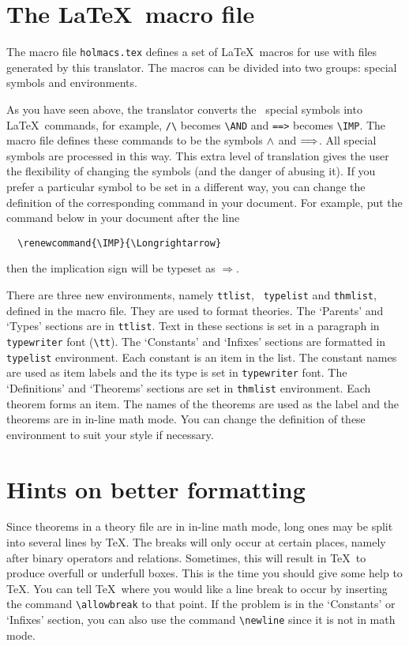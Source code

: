 \section{The \LaTeX\ macro file}

The macro file {\tt holmacs.tex} defines a set of \LaTeX\ macros for
use with files generated by this translator. The macros can be divided
into two groups: special symbols and environments.

As you have seen above, the translator converts the \HOL\ special
symbols into \LaTeX\ commands, for example, \verb|/\| becomes
\verb|\AND| and \verb|==>| becomes \verb|\IMP|. The macro file defines
these commands to be the symbols $\AND$ and $\IMP$. All special
symbols are processed in this way. This extra level of translation
gives the user the flexibility of changing the symbols (and the danger
of abusing it). If you prefer a
particular symbol to be set in a different way, you can change the
definition of the corresponding command in your document. For example,
put the command below in your document after the \verb||
line
\begin{verbatim}
  \renewcommand{\IMP}{\Longrightarrow}
\end{verbatim}
then the implication sign will be typeset as $\Longrightarrow$.

There are three new environments, namely {\tt ttlist}, {\tt
typelist} and {\tt thmlist}, defined in the macro file. They are used
to format theories. The 
`Parents' and `Types' sections are in {\tt ttlist}. Text in these
sections is set in a paragraph in {\tt typewriter} font (\verb|\tt|).
The `Constants' and `Infixes' sections are formatted in {\tt typelist}
environment. Each constant is an item in the list.
The constant names are used as item labels
 and the its type is set in {\tt typewriter} font. The `Definitions' and
`Theorems' sections are set in {\tt thmlist} environment. Each theorem
forms an item. The names of the theorems are used as the label and the
theorems are in in-line math mode. You can change the definition of
these environment to suit your style if necessary.

\section{Hints on better  formatting}

Since theorems in a theory file are in in-line math mode, long ones
may be split into several lines by \TeX. The breaks will only occur at
certain places, namely after binary operators and relations.
Sometimes, this will result in \TeX\ to produce overfull or underfull
boxes. This is the time you should give some help to \TeX. You can
tell \TeX\ where you would like a line
break to occur by inserting the command \verb|\allowbreak|  to that point.
If the problem is in the `Constants' or `Infixes' section, you can
also use the command \verb|\newline| since 
it is not in math mode.

